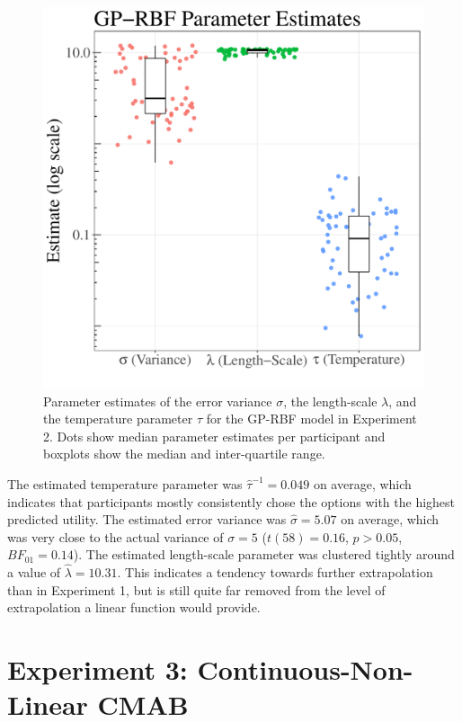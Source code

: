 \documentclass[a4paper,natbib]{apa6}
\begin{document}
\begin{figure}[ht!]
\centering
\includegraphics[scale=0.5]{par2.pdf}
\caption{Parameter estimates of the error variance $\sigma$, the length-scale $\lambda$, and the temperature parameter $\tau$ for the GP-RBF model in Experiment 2. Dots show median parameter estimates per participant and boxplots show the median and inter-quartile range.}
\label{fig:par2}
\end{figure}
%
The estimated temperature parameter was $\hat{\tau}^{-1}=0.049$ on average, which indicates that participants mostly consistently chose the options with the highest predicted utility. The estimated error variance was $\hat{\sigma}=5.07$ on average, which was very close to the actual variance of $\sigma=5$ ($t(58)=0.16$, $p>0.05$, $BF_{01}=0.14$). The estimated length-scale parameter was clustered tightly around a value of $\hat{\lambda}=10.31$. This indicates a tendency towards further extrapolation than in Experiment 1, but is still quite far removed from the level of extrapolation a linear function would provide. 


\section{Experiment 3: Continuous-Non-Linear CMAB}
\end{document}
